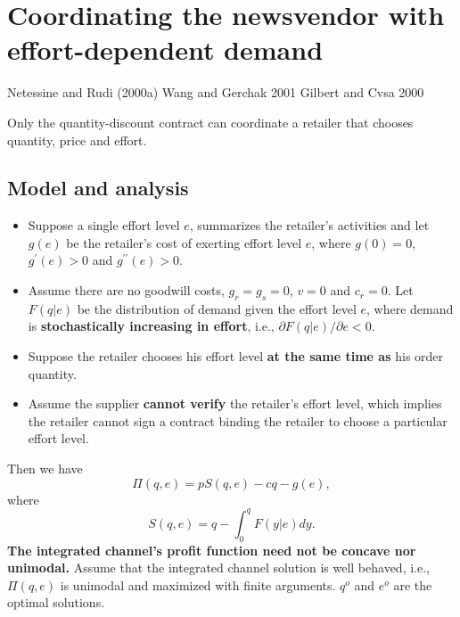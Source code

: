 \thispagestyle{empty}
\section{Coordinating the newsvendor with effort-dependent demand}
\begin{note}
    Netessine and Rudi (2000a)
    Wang and Gerchak 2001
    Gilbert and Cvsa 2000
\end{note}
Only the quantity-discount contract can coordinate a retailer that chooses quantity, price and effort.

\subsection{Model and analysis}
\begin{itemize}
    \item Suppose a single effort level $e$, summarizes the retailer's activities and let $g(e)$ be the retailer's cost of exerting effort level $e$, where $g(0)=0$, $g^\prime(e)>0$ and $g^{\prime\prime}(e)>0$.
    \item  Assume there are no goodwill costs, $g_r=g_s=0$, $v=0$ and $c_r=0$. Let $F(q|e)$ be the distribution of demand given the effort level $e$, where demand is \textbf{stochastically increasing in effort}, i.e., $\partial F(q|e)/\partial e<0$.
    \item Suppose the retailer chooses his effort level \textbf{at the same time as} his order quantity. 
    \item Assume the supplier \textbf{cannot verify} the retailer's effort level, which implies the retailer cannot sign a contract binding the retailer to choose a particular effort level.
\end{itemize}

Then we have 
\begin{equation*}
    \Pi(q,e)=p S(q,e)-c q-g(e),
\end{equation*}
where 
\begin{equation*}
    S(q,e)=q-\int_0^q F(y|e)dy.
\end{equation*}
\textbf{The integrated channel’s profit function need not be concave nor unimodal.}
 Assume that the integrated channel solution is well behaved, i.e., $\Pi(q,e)$ is unimodal and maximized with finite arguments. $q^o$ and $e^o$ are the optimal solutions.

